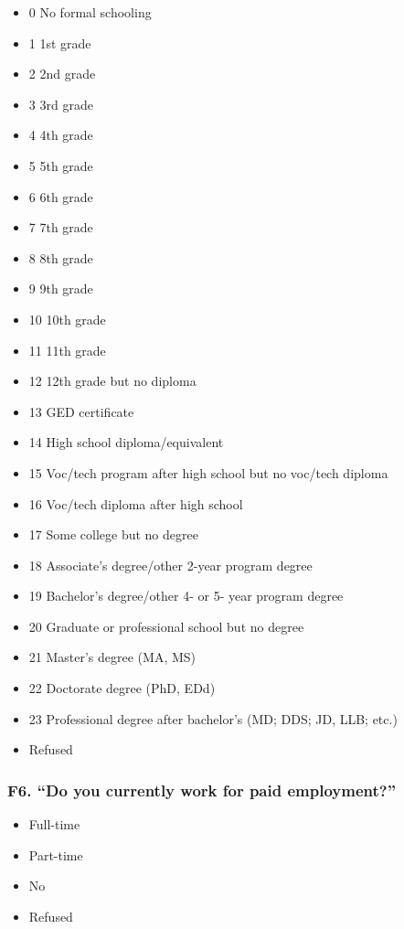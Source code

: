 \documentclass[
  12pt,
]{book}
\providecommand{\tightlist}{%
  \setlength{\itemsep}{0pt}\setlength{\parskip}{0pt}}
\begin{document}
\begin{itemize}
\tightlist
\item
  0 No formal schooling
\item
  1 1st grade
\item
  2 2nd grade
\item
  3 3rd grade
\item
  4 4th grade
\item
  5 5th grade
\item
  6 6th grade
\item
  7 7th grade
\item
  8 8th grade
\item
  9 9th grade
\item
  10 10th grade
\item
  11 11th grade
\item
  12 12th grade but no diploma
\item
  13 GED certificate
\item
  14 High school diploma/equivalent
\item
  15 Voc/tech program after high school but no voc/tech diploma
\item
  16 Voc/tech diploma after high school
\item
  17 Some college but no degree
\item
  18 Associate's degree/other 2-year program degree
\item
  19 Bachelor's degree/other 4- or 5- year program degree
\item
  20 Graduate or professional school but no degree
\item
  21 Master's degree (MA, MS)
\item
  22 Doctorate degree (PhD, EDd)
\item
  23 Professional degree after bachelor's (MD; DDS; JD, LLB; etc.)
\item
  Refused
\end{itemize}

\hypertarget{f6.-do-you-currently-work-for-paid-employment}{%
\subsubsection*{F6. ``Do you currently work for paid employment?''}\label{f6.-do-you-currently-work-for-paid-employment}}

\begin{itemize}
\tightlist
\item
  Full-time
\item
  Part-time
\item
  No
\item
  Refused
\end{itemize}
\end{document}
